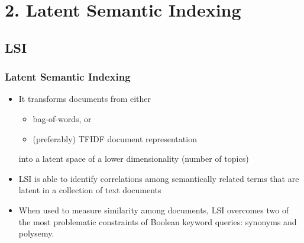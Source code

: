 \documentclass{beamer}
\begin{document}
\section{2. Latent Semantic Indexing}
\subsection{LSI}

\begin{frame}
    \frametitle{Latent Semantic Indexing}
    
    \begin{itemize}
    \item It transforms documents from either
        \begin{itemize}
            \item bag-of-words, or
            \item (preferably) TFIDF document representation
        \end{itemize}
        into a latent space of a lower dimensionality (number of topics)
    \vspace{.2cm}
    \item LSI is able to identify correlations among semantically related terms that are latent in a collection of text documents
    \vspace{.2cm}
    \item When used to measure similarity among documents, LSI overcomes two of the most problematic constraints of Boolean keyword queries: synonyms and polysemy.
    \end{itemize}
\end{frame}
\end{document}
